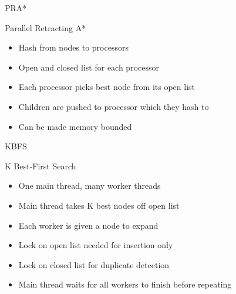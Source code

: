 \documentclass[style=unh]{powerdot}
\begin{document}

\begin{slide}{PRA*}
  \vspace{.2in}
  \begin{center}
    Parallel Retracting A*
  \end{center}

  \vspace{.1in}

  \begin{itemize}[type=1]
  \item Hash from nodes to processors
  \item Open and closed list for each processor
  \item Each processor picks best node from its open list
  \item Children are pushed to processor which they hash to
  \item Can be made memory bounded
  \end{itemize}
\end{slide}


\begin{slide}{KBFS}
  \vspace{.2in}
  \begin{center}
    K Best-First Search
  \end{center}

  \vspace{.1in}

  \begin{itemize}[type=1]
  \item One main thread, many worker threads
  \item Main thread takes K best nodes off open list
  \item Each worker is given a node to expand
  \item Lock on open list needed for insertion only
  \item Lock on closed list for duplicate detection
  \item Main thread waits for all workers to finish before repeating
  \end{itemize}
\end{slide}

\end{document}
